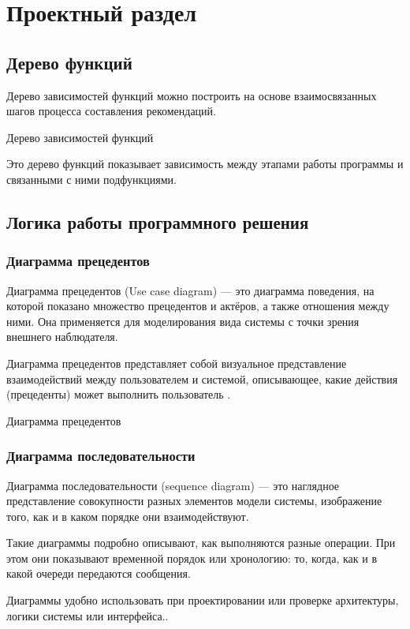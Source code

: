 \chapter{Проектный раздел}

\section{Дерево функций}

Дерево зависимостей функций можно построить на основе взаимосвязанных
шагов процесса составления рекомендаций.

\begin{image}
	\caption{Дерево зависимостей функций}
	\label{fig:funcTree}
\end{image}

Это дерево функций показывает зависимость между этапами работы программы
и связанными с ними подфункциями.

\section{Логика работы программного решения}

\subsection{Диаграмма прецедентов}

Диаграмма прецедентов (Use case diagram) --- это диаграмма поведения,
на которой показано множество прецедентов и актёров,
а также отношения между ними. Она применяется для моделирования вида системы
с точки зрения внешнего наблюдателя.

Диаграмма прецедентов представляет собой визуальное представление
взаимодействий между пользователем и системой, описывающее,
какие действия (прецеденты) может выполнить пользователь .

\begin{image}
	\caption{Диаграмма прецедентов}
	\label{fig:use:case}
\end{image}

\subsection{Диаграмма последовательности}

Диаграмма последовательности (sequence diagram) --- это наглядное
представление совокупности разных элементов модели системы,
изображение того, как и в каком порядке они взаимодействуют.\par
Такие диаграммы подробно описывают, как выполняются разные операции.
При этом они показывают временной порядок или хронологию:
то, когда, как и в какой очереди передаются сообщения.\par
Диаграммы удобно использовать при проектировании или проверке архитектуры,
логики системы или интерфейса..

